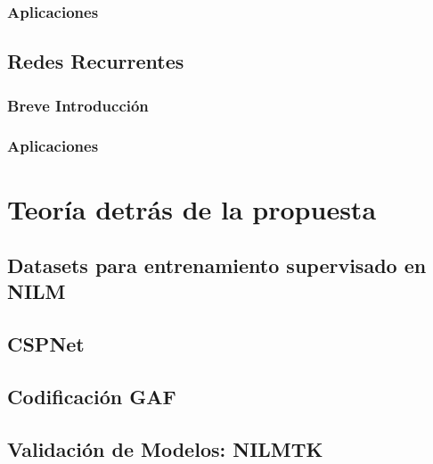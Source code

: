 \subsubsection{Aplicaciones}

\subsection{Redes Recurrentes}
\subsubsection{Breve Introducción}
\subsubsection{Aplicaciones}

\section{Teoría detrás de la propuesta}
\subsection{Datasets para entrenamiento supervisado en NILM}
\subsection{CSPNet}     
\subsection{Codificación GAF} 
\subsection{Validación de Modelos: NILMTK}  

